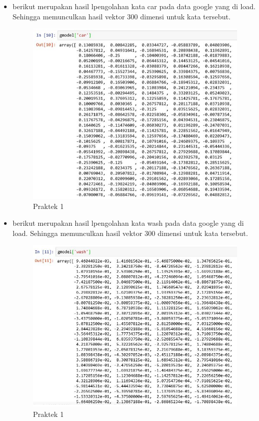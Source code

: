 \begin{enumerate}
\begin{itemize}
\item berikut merupakan hasil lpengolahan kata car pada data google yang di load. Sehingga memunculkan hasil vektor 300 dimensi untuk kata tersebut. 

\begin{figure}[ht]
\centering
\includegraphics[scale=0.6]{figures/1174008/5/2,1,8.PNG}
\caption{Praktek 1}
\end{figure}

\item berikut merupakan hasil lpengolahan kata wash pada data google yang di load. Sehingga memunculkan hasil vektor 300 dimensi untuk kata tersebut. 

\begin{figure}[ht]
\centering
\includegraphics[scale=0.6]{figures/1174008/5/2,1,9.PNG}
\caption{Praktek 1}
\end{figure}


\end{itemize}
\end{enumerate}

